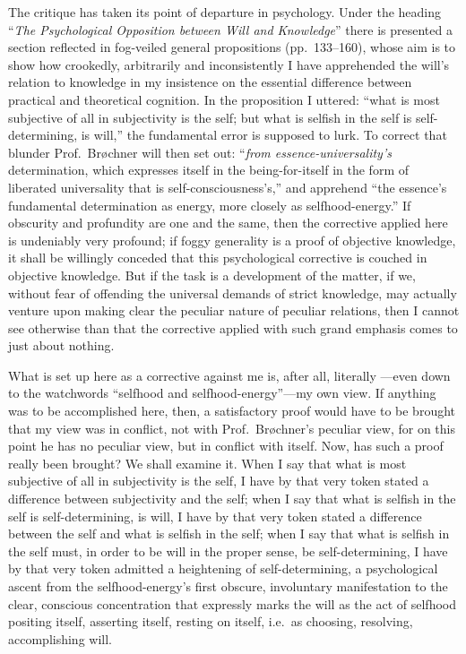 \documentclass[12pt]{book}
\newcommand{\opage}[1]{\marginnote{\footnotesize\textit{[#1]}}}
\begin{document}
The critique has taken its point of departure in psychology. Under the
heading ``\emph{The Psychological Opposition between Will and
Knowledge}'' there is presented a section reflected in fog-veiled
general propositions (pp.\ 133--160), whose aim is to show how
crookedly, arbitrarily and inconsistently I have apprehended the will's
relation to knowledge in my insistence on the essential difference
between practical and theoretical cognition. In the proposition I
uttered: ``what is most subjective of all in subjectivity is the self;
but what is selfish in the self is self-determining, is will,'' the
fundamental error is supposed to lurk.
To correct that blunder Prof.\ Brøchner will then set out: ``\emph{from
essence-universality's} determination, which expresses itself in the
being-for-itself in the form of liberated universality that is
self-consciousness's,'' and apprehend ``the essence's fundamental
determination as energy, more closely as selfhood-energy.'' If obscurity
and profundity are one and the same, then the corrective applied here is
undeniably very profound; if foggy generality is a proof of objective
knowledge, it shall be willingly conceded that this psychological
corrective is couched in objective knowledge. But if the task is a
development of the matter, if we, without fear of offending the universal
demands of strict knowledge, may actually venture upon making clear the
peculiar nature of peculiar relations, then I cannot see otherwise than
that the corrective applied with such grand emphasis comes to just about
nothing.

\opage{21}\setcounter{footnote}{0}%
What is set up here as a corrective against me is, after all, literally
---even down to the watchwords ``selfhood and selfhood-energy''---my own
view. If anything was to be accomplished here, then, a satisfactory proof
would have to be brought that my view was in conflict, not with Prof.\
Brøchner's peculiar view, for on this point he has no peculiar view, but
in conflict with itself. Now, has such a proof really been brought? We
shall examine it. When I say that what is most subjective of all in
subjectivity is the self, I have by that very token stated a difference
between subjectivity and the self; when I say that what is selfish in the
self is self-determining, is will, I have by that very token stated a
difference between the self and what is selfish in the self; when I say
that what is selfish in the self must, in order to be will in the proper
sense, be self-determining, I have by that very token admitted a
heightening of self-determining, a psychological ascent from the
selfhood-energy's first obscure, involuntary manifestation to the clear,
conscious concentration that expressly marks the will as the act of
selfhood positing itself, asserting itself, resting on itself, i.e.\ as
choosing, resolving, accomplishing will.
\end{document}
